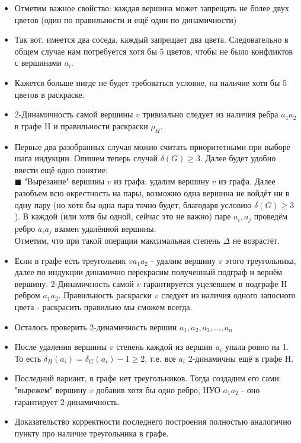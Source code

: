 \documentclass[12pt,a4paper]{article}
\theoremstyle{plain} %
\theoremstyle{definition} %
\theoremstyle{remark} %
\begin{document}
\begin{itemize}
	$\blacksquare$  Вершина "запрещает" цвет $k$, если при покраске её не раскрашенного соседа в этот цвет раскраска потеряет правильность или 2-динамичность.\\
	\item Отметим важное свойство: каждая вершина может запрещать не более двух цветов (один по правильности и ещё один по динамичности)
	\item Так вот, имеется два соседа, каждый запрещает два цвета. Следовательно в общем случае нам потребуется хотя бы 5 цветов, чтобы не было конфликтов с вершинами $a_i$. 
	\item Кажется больше нигде не будет требоваться условие, на наличие хотя бы 5 цветов в раскраске.
	\item 2-Динамичность самой вершины $v$ тривиально следует из наличия ребра $a_1a_2$ в графе H и правильности раскраски $\rho_H$.
	\item Первые два разобранных случая можно считать приоритетными при выборе шага индукции. Опишем теперь случай $\delta(G) \geq 3$. Далее будет удобно ввести ещё одно понятие:\\
	$\blacksquare$ "Вырезание" вершины $v$ из графа: удалим вершину $v$ из графа. Далее разобъем всю окрестность на пары, возможно одна вершина не войдёт ни в одну пару (но хотя бы одна пара точно будет, благодаря условию $\delta(G) \geq 3$). В каждой (или хотя бы одной, сейчас это не важно) паре $a_i, a_j$ проведём ребро $a_ia_j$ взамен удалённой вершины.\\
	Отметим, что при такой операции максимальная степень $\Delta$ не возрастёт.
	\item Если в графе есть треугольник $va_1a_2$ - удалим вершину $v$ этого треугольника, далее по индукции динамично перекрасим полученный подграф и вернём вершину. 2-Динамичность самой $v$ гарантируется уцелевшем в подграфе H ребром $a_1a_2$. Правильность раскраски $v$ следует из наличия одного запосного цвета - раскрасить правильно мы сможем всегда.
	\item Осталось проверить 2-динамичность вершин $a_1, a_2, a_3, ..., a_n$
	\item После удаления вершины $v$ степень каждой из вершин $a_i$ упала ровно на 1. То есть $\delta_H(a_i) = \delta_G(a_i) - 1 \geq 2$, т.е. все $a_i$ 2-динамичны ещё в графе H.
	\item Последний вариант, в графе нет треугольников. Тогда создадим его сами: "вырежем" вершину $v$ добавив хотя бы одно ребро, НУО $a_1a_2$ - оно гарантирует 2-динамичность.
	\item Доказательство корректности последнего построения полностью аналогично пункту про наличие треугольника в графе.
	\end{itemize}
\end{document}
